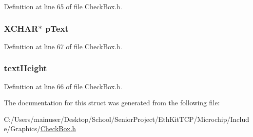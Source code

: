 Definition at line 65 of file Check\+Box.\+h.

\hypertarget{struct_c_h_e_c_k_b_o_x_a934b5563cdaf14803728ff3a7b7e8c7f}{}
\subsubsection[{p\+Text}]{\setlength{\rightskip}{0pt plus 5cm}X\+C\+H\+A\+R$\ast$ p\+Text}\label{struct_c_h_e_c_k_b_o_x_a934b5563cdaf14803728ff3a7b7e8c7f}


Definition at line 67 of file Check\+Box.\+h.

\hypertarget{struct_c_h_e_c_k_b_o_x_a40fa9c35391b0005032180b85e7afd34}{}
\subsubsection[{text\+Height}]{ text\+Height}\label{struct_c_h_e_c_k_b_o_x_a40fa9c35391b0005032180b85e7afd34}


Definition at line 66 of file Check\+Box.\+h.



The documentation for this struct was generated from the following file\+:\begin{DoxyCompactItemize}
\item 
C\+:/\+Users/mainuser/\+Desktop/\+School/\+Senior\+Project/\+Eth\+Kit\+T\+C\+P/\+Microchip/\+Include/\+Graphics/\hyperlink{_check_box_8h}{Check\+Box.\+h}\end{DoxyCompactItemize}
